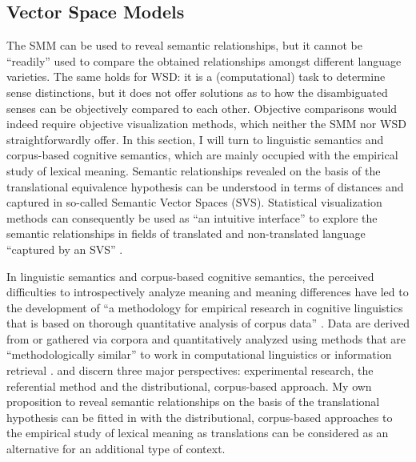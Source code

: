 \subsection{Vector Space Models}
\label{sec:2.4.2}  
The SMM can be used to reveal semantic relationships, but it cannot be “readily” used to compare the obtained relationships amongst different language varieties. The same holds for WSD: it is a (computational) task to determine sense distinctions, but it does not offer solutions as to how the disambiguated senses can be objectively compared to each other. Objective comparisons would indeed require objective visualization methods, which neither the SMM nor WSD straightforwardly offer. In this section, I will turn to linguistic semantics and corpus-based cognitive semantics, which are mainly occupied with the empirical study of lexical meaning. Semantic relationships revealed on the basis of the translational equivalence hypothesis can be understood in terms of distances and captured in so-called Semantic Vector Spaces (SVS). Statistical visualization methods can consequently be used as “an intuitive interface” \citep[17]{heylen_looking_2012} to explore the semantic relationships in fields of translated and non-translated language “captured by an SVS” \citep{heylen_looking_2012}.

In linguistic semantics and corpus-based cognitive semantics, the perceived difficulties to introspectively analyze meaning and meaning differences have led to the development of “a methodology for empirical research in cognitive linguistics that is based on thorough quantitative analysis of corpus data” \citep[91]{kristiansen_methodological_2008}. Data are derived from or gathered via corpora and quantitatively analyzed using methods that are “methodologically similar” to work in computational linguistics or information retrieval \citep[6]{gries_introduction_2006}. \citet[242]{riemer_sense_2016} and \citet{glynn_empirical_2010} discern three major perspectives: experimental research, the referential method and the distributional, corpus-based approach. My own proposition to reveal semantic relationships on the basis of the translational hypothesis can be fitted in with the distributional, corpus-based approaches to the empirical study of lexical meaning as translations can be considered as an alternative for an additional type of context.

